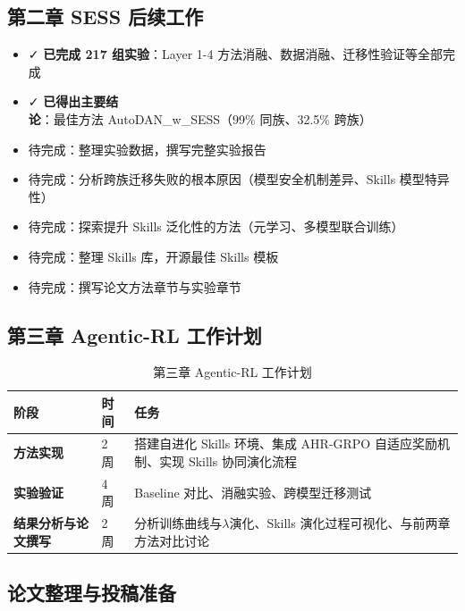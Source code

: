 \documentclass[12pt,a4paper]{article}
\newcommand{\highlight}[1]{\textcolor{primaryblue}{\textbf{#1}}}
\newcommand{\success}[1]{\textcolor{successgreen}{#1}}
\begin{document}
\subsection{第二章 SESS 后续工作}

\begin{itemize}
    \item \success{✓} \highlight{已完成 217 组实验}：Layer 1-4 方法消融、数据消融、迁移性验证等全部完成
    \item \success{✓} \highlight{已得出主要结论}：最佳方法 AutoDAN\_w\_SESS（99\% 同族、32.5\% 跨族）
    \item 待完成：整理实验数据，撰写完整实验报告
    \item 待完成：分析跨族迁移失败的根本原因（模型安全机制差异、Skills 模型特异性）
    \item 待完成：探索提升 Skills 泛化性的方法（元学习、多模型联合训练）
    \item 待完成：整理 Skills 库，开源最佳 Skills 模板
    \item 待完成：撰写论文方法章节与实验章节
\end{itemize}

\subsection{第三章 Agentic-RL 工作计划}

\begin{table}[H]
    \centering
    \begin{tabular}{@{}l l l@{}}
        \toprule
        \rowcolor{tableheader}
        \textbf{阶段} & \textbf{时间} & \textbf{任务} \\
        \midrule
        \textbf{方法实现} & 2 周 & 搭建自进化 Skills 环境、集成 AHR-GRPO 自适应奖励机制、实现 Skills 协同演化流程 \\
        \textbf{实验验证} & 4 周 & Baseline 对比、消融实验、跨模型迁移测试 \\
        \textbf{结果分析与论文撰写} & 2 周 & 分析训练曲线与$\lambda$演化、Skills 演化过程可视化、与前两章方法对比讨论 \\
        \bottomrule
    \end{tabular}
    \caption{第三章 Agentic-RL 工作计划}
    \label{tab:agentic_plan}
\end{table}

\subsection{论文整理与投稿准备}
\end{document}
